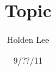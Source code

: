 \documentclass[12pt]{article}
\theoremstyle{norm}
\begin{document}
\title{Topic}%
\author{Holden Lee}
\date{9/??/11}%
\maketitle
\thispagestyle{empty}
\section{}
\end{document}
